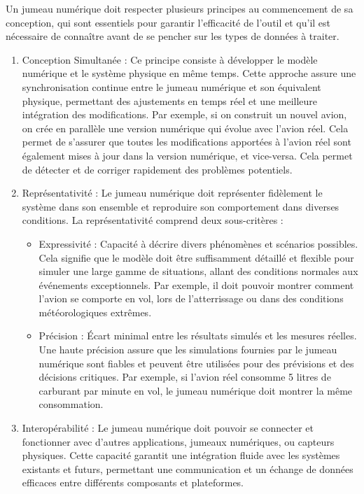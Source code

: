 Un jumeau numérique doit respecter plusieurs principes au commencement de sa conception, qui sont essentiels pour garantir l’efficacité de l’outil et qu'il est nécessaire de connaître avant de se pencher sur les types de données à traiter.\\

\begin{enumerate}
    \item Conception Simultanée : Ce principe consiste à développer le modèle numérique et le système physique en même temps. Cette approche assure une synchronisation continue entre le jumeau numérique et son équivalent physique, permettant des ajustements en temps réel et une meilleure intégration des modifications. Par exemple, si on construit un nouvel avion, on crée en parallèle une version numérique qui évolue avec l’avion réel. Cela permet de s'assurer que toutes les modifications apportées à l'avion réel sont également mises à jour dans la version numérique, et vice-versa. Cela permet de détecter et de corriger rapidement des problèmes potentiels.\\
    \item Représentativité : Le jumeau numérique doit représenter fidèlement le système dans son ensemble et reproduire son comportement dans diverses conditions. La représentativité comprend deux sous-critères :
    \begin{itemize}
        \item Expressivité : Capacité à décrire divers phénomènes et scénarios possibles. Cela signifie que le modèle doit être suffisamment détaillé et flexible pour simuler une large gamme de situations, allant des conditions normales aux événements exceptionnels. Par exemple, il doit pouvoir montrer comment l’avion se comporte en vol, lors de l’atterrissage ou dans des conditions météorologiques extrêmes.\\
        \item Précision : Écart minimal entre les résultats simulés et les mesures réelles. Une haute précision assure que les simulations fournies par le jumeau numérique sont fiables et peuvent être utilisées pour des prévisions et des décisions critiques. Par exemple, si l’avion réel consomme 5 litres de carburant par minute en vol, le jumeau numérique doit montrer la même consommation.\\
    \end{itemize}
    \item Interopérabilité : Le jumeau numérique doit pouvoir se connecter et fonctionner avec d'autres applications, jumeaux numériques, ou capteurs physiques. Cette capacité garantit une intégration fluide avec les systèmes existants et futurs, permettant une communication et un échange de données efficaces entre différents composants et plateformes.\\

\end{enumerate}
